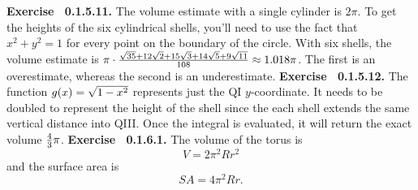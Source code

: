  {\noindent \protect \bf  Exercise ~0.1.5.11.} The volume estimate with a single cylinder is $2\pi $. To get the heights of the six cylindrical shells, you'll need to use the fact that $x^2+y^2=1$ for every point on the boundary of the circle. With six shells, the volume estimate is $\pi \cdot \protect \frac  {\protect \sqrt  {35} + 12 \protect \sqrt  {2} + 15 \protect \sqrt  {3} + 14 \protect \sqrt  {5} + 9 \protect \sqrt  {11}}{108}\approx 1.018\pi $. The first is an overestimate, whereas the second is an underestimate. \protect \newline  \protect \newline  
 {\noindent \protect \bf  Exercise ~0.1.5.12.} The function $g(x)=\protect \sqrt  {1-x^2}$ represents just the QI $y$-coordinate. It needs to be doubled to represent the height of the shell since the each shell extends the same vertical distance into QIII. Once the integral is evaluated, it will return the exact volume $\protect \frac  {4}{3}\pi $. \protect \newline  \protect \newline  
 {\noindent \protect \bf  Exercise ~0.1.6.1.} The volume of the torus is $$V=2\pi ^2Rr^2 $$ and the surface area is $$SA=4\pi ^2Rr. $$ \protect \newline  \protect \newline  
